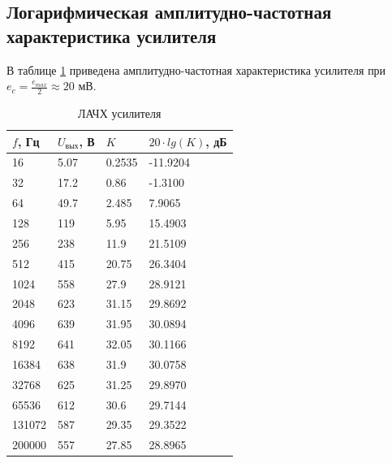 \subsection{Логарифмическая амплитудно-частотная характеристика усилителя}

В таблице \ref{tabular:3} приведена амплитудно-частотная характеристика усилителя при $e_c = \frac{e_{max}}{2} \approx 20$ мВ.

\begin{table}[H]
	\begin{center}
	\caption{ЛАЧХ усилителя}
	\def\arraystretch{1.2}
		\begin{tabularx}{\textwidth}{|X|X|X|X|}
			\hline
			$f$, Гц & $U_\text{вых}$, В & $K$ & $20 \cdot lg(K)$, дБ\\\hline
			16 & 5.07 & 0.2535 & -11.9204\\\hline	
			32 & 17.2 & 0.86 & -1.3100\\\hline	
			64 & 49.7 & 2.485 & 7.9065\\\hline	
			128 & 119 & 5.95 & 15.4903\\\hline	
			256 & 238 & 11.9 & 21.5109\\\hline	
			512 & 415 & 20.75 & 26.3404\\\hline	
			1024 & 558 & 27.9 & 28.9121\\\hline	
			2048 & 623 & 31.15 & 29.8692\\\hline	
			4096 & 639 & 31.95 & 30.0894\\\hline	
			8192 & 641 & 32.05 & 30.1166\\\hline	
			16384 & 638 & 31.9 & 30.0758\\\hline	
			32768 & 625 & 31.25 & 29.8970\\\hline	
			65536 & 612 & 30.6 & 29.7144\\\hline	
			131072 & 587 & 29.35 & 29.3522\\\hline	
			200000 & 557 & 27.85 & 28.8965\\\hline	
		\end{tabularx}
		\label{tabular:3}
	\end{center}
\end{table}

